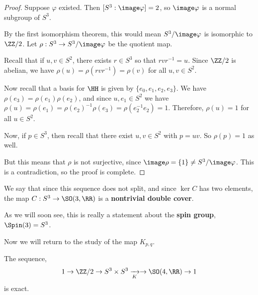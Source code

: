 \begin{proof}
    Suppose $\varphi$ existed. Then $[S^3 :\image \varphi] = 2$, so $\image\varphi$ is a normal subgroup of $S^3$.

    By the first isomorphism theorem, this would mean $S^3/\image\varphi$ is isomorphic to $\ZZ/2$. Let $\rho : S^3 \to S^3/\image\varphi$ be the quotient map.

    Recall that if $u,v\in S^2$, there exists $r\in S^3$ so that $rvr^{-1} = u$. Since $\ZZ/2$ is abelian, we have $\rho(u)=\rho(rvr^{-1}) = \rho(v)$ for all $u,v\in S^2$.

    Now recall that a basis for $\HH$ is given by $\{e_0,e_1,e_2,e_3\}$. We have $\rho(e_3)=\rho(e_1)\rho(e_2)$, and since $u,e_1\in S^2$ we have $\rho(u) = \rho(e_1) = \rho(e_2)^{-1}\rho(e_3) = \rho(e_2^{-1}e_2)=1$. Therefore, $\rho(u)=1$ for all $u \in S^2$.

    Now, if $p \in S^3$, then recall that there exist $u,v\in S^2$ with $p=uv$. So $\rho(p) = 1$ as well. 

    But this means that $\rho$ is not surjective, since $\image \rho = \{1\} \neq S^3/\image\varphi$. This is a contradiction, so the proof is complete.
\end{proof}
\begin{remark*}
    We say that since this sequence does not split, and since $\ker C$ has two elements, the map $C : S^3\to \SO(3,\RR)$ is a \textbf{nontrivial double cover}.
\end{remark*}
\begin{remark*}
    As we will soon see, this is really a statement about the \textbf{spin group}, $\Spin(3) = S^3$.
\end{remark*}
Now we will return to the study of the map $K_{p,q}$. 
\begin{lemma}
    The sequence,
    \[1\to \ZZ/2\to S^3\times S^3 \xrightarrow[K]{} \to \SO(4,\RR) \to 1\]
    is exact.
\end{lemma}
